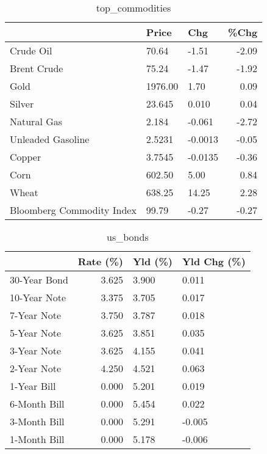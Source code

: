 \documentclass{article}%
\begin{document}
\begin{table}[htbp]%
\caption{top\_commodities}%
\centering%
\begin{adjustbox}{width=1\textwidth}%
\begin{tabular}{lllr}
\toprule
                          &   Price &     Chg &  \%Chg \\
\midrule
               Crude Oil  &   70.64 &   -1.51 & -2.09 \\
             Brent Crude  &   75.24 &   -1.47 & -1.92 \\
                    Gold  & 1976.00 &    1.70 &  0.09 \\
                  Silver  &  23.645 &   0.010 &  0.04 \\
             Natural Gas  &   2.184 &  -0.061 & -2.72 \\
       Unleaded Gasoline  &  2.5231 & -0.0013 & -0.05 \\
                  Copper  &  3.7545 & -0.0135 & -0.36 \\
                    Corn  &  602.50 &    5.00 &  0.84 \\
                   Wheat  &  638.25 &   14.25 &  2.28 \\
Bloomberg Commodity Index &   99.79 &   -0.27 & -0.27 \\
\bottomrule
\end{tabular}
%
\end{adjustbox}%
\end{table}

%


\begin{table}[htbp]%
\caption{us\_bonds}%
\centering%
\begin{adjustbox}{width=1\textwidth}%
\begin{tabular}{lrll}
\toprule
             &  Rate (\%) & Yld (\%) & Yld Chg (\%) \\
\midrule
30-Year Bond &     3.625 &   3.900 &       0.011 \\
10-Year Note &     3.375 &   3.705 &       0.017 \\
 7-Year Note &     3.750 &   3.787 &       0.018 \\
 5-Year Note &     3.625 &   3.851 &       0.035 \\
 3-Year Note &     3.625 &   4.155 &       0.041 \\
 2-Year Note &     4.250 &   4.521 &       0.063 \\
 1-Year Bill &     0.000 &   5.201 &       0.019 \\
6-Month Bill &     0.000 &   5.454 &       0.022 \\
3-Month Bill &     0.000 &   5.291 &      -0.005 \\
1-Month Bill &     0.000 &   5.178 &      -0.006 \\
\bottomrule
\end{tabular}
%
\end{adjustbox}%
\end{table}
\end{document}
